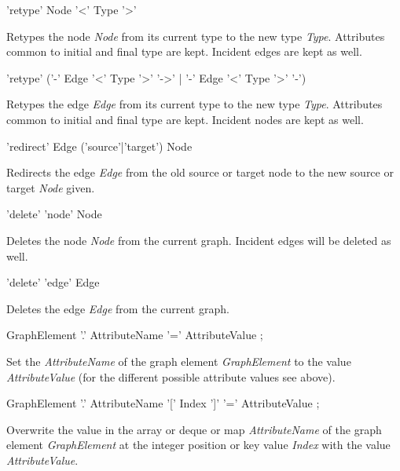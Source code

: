 \begin{rail}
  'retype' Node '<' Type '>'
\end{rail}
Retypes the node \emph{Node} from its current type to the new type \emph{Type}. Attributes common to initial and final type are kept. Incident edges are kept as well. 

\begin{rail}
  'retype' ('-' Edge '<' Type '>' '->' | '-' Edge '<' Type '>' '-')
\end{rail}
Retypes the edge \emph{Edge} from its current type to the new type \emph{Type}. Attributes common to initial and final type are kept. Incident nodes are kept as well.

\begin{rail}
  'redirect' Edge ('source'|'target') Node
\end{rail}
Redirects the edge \emph{Edge} from the old source or target node to the new source or target \emph{Node} given.

\begin{rail}
  'delete' 'node' Node
\end{rail}
Deletes the node \emph{Node} from the current graph.
Incident edges will be deleted as well.

\begin{rail}
  'delete' 'edge' Edge
\end{rail}
Deletes the edge \emph{Edge} from the current graph.

\begin{rail}
  GraphElement '.' AttributeName '=' AttributeValue ;
\end{rail}
Set the  \emph{AttributeName} of the graph element \emph{GraphElement} to the value \emph{AttributeValue} (for the different possible attribute values see above).

\begin{rail}
  GraphElement '.' AttributeName '[' Index ']' '=' AttributeValue ;
\end{rail}
Overwrite the value in the array or deque or map  \emph{AttributeName} of the graph element \emph{GraphElement} at the integer position or key value \emph{Index} with the value \emph{AttributeValue}.

